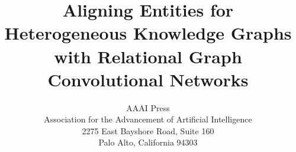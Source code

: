 \documentclass[letterpaper]{article} %
\begin{document}
	\title{Aligning Entities for Heterogeneous Knowledge Graphs \\
		with Relational Graph Convolutional Networks}
	\author{AAAI Press\\
		Association for the Advancement of Artificial Intelligence\\
		2275 East Bayshore Road, Suite 160\\
		Palo Alto, California 94303\\
	}
	\maketitle
	










	
	
\end{document}
